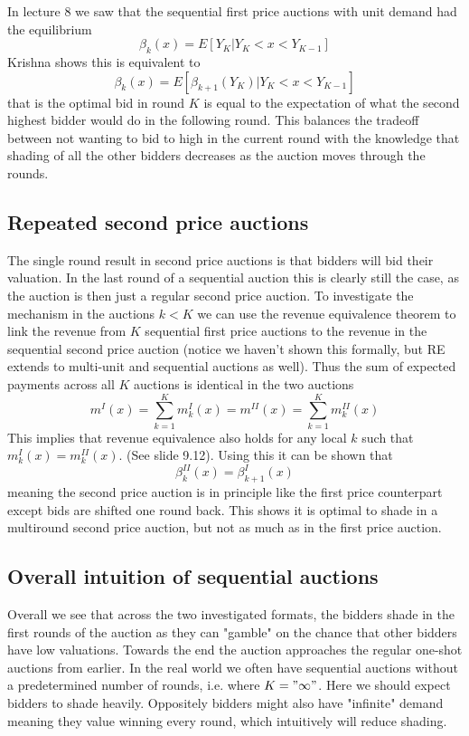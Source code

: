 In lecture 8 we saw that the sequential first price auctions with unit demand had the equilibrium 
\begin{equation}
    \beta_k(x) = E[Y_K|Y_K < x < Y_{K-1}]
\end{equation}
Krishna shows this is equivalent to 
\begin{equation}
    \beta_k(x) = E[\beta_{k+1}(Y_K)|Y_K < x < Y_{K-1}]
\end{equation}
that is the optimal bid in round $K$ is equal to the expectation of what the second highest bidder would do in the following round. This balances the tradeoff between not wanting to bid to high in the current round with the knowledge that shading of all the other bidders decreases as the auction moves through the rounds. 

\subsection{Repeated second price auctions}
The single round result in second price auctions is that bidders will bid their valuation. In the last round of a sequential auction this is clearly still the case, as the auction is then just a regular second price auction. To investigate the mechanism in the auctions $k<K$ we can use the revenue equivalence theorem to link the revenue from $K$ sequential first price auctions to the revenue in the sequential second price auction (notice we haven't shown this formally, but RE extends to multi-unit and sequential auctions as well). Thus the sum of expected payments across all $K$ auctions is identical in the two auctions 
\begin{equation}
    m^I(x) = \sum_{k=1}^K m_k^I(x) = m^{II}(x) = \sum_{k=1}^K m_k^{II}(x)
\end{equation} 
This implies that revenue equivalence also holds for any local $k$ such that $m_k^I(x)=m_k^{II}(x)$. (See slide 9.12). Using this it can be shown that 
\begin{equation}
    \beta_k^{II}(x) = \beta_{k+1}^I(x)
\end{equation}
meaning the second price auction is in principle like the first price counterpart except bids are shifted one round back. This shows it is optimal to shade in a multiround second price auction, but not as much as in the first price auction. 

\subsection{Overall intuition of sequential auctions}
Overall we see that across the two investigated formats, the bidders shade in the first rounds of the auction as they can "gamble" on the chance that other bidders have low valuations. Towards the end the auction approaches the regular one-shot auctions from earlier. In the real world we often have sequential auctions without a predetermined number of rounds, i.e. where $K="\infty"$. Here we should expect bidders to shade heavily. Oppositely bidders might also have "infinite" demand meaning they value winning every round, which intuitively will reduce shading. 